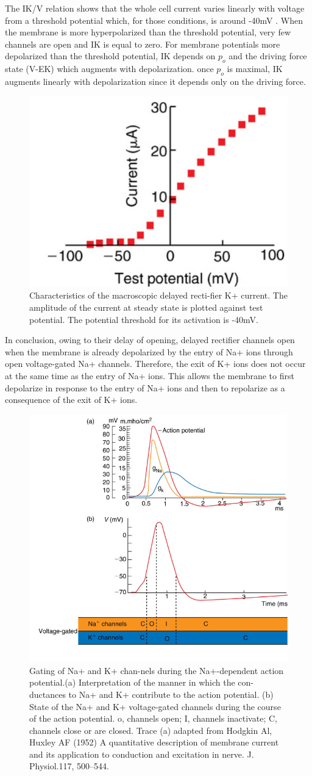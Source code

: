 \documentclass[../../Orator]{subfiles}
\begin{document}
The IK/V relation shows that the whole cell current varies linearly with voltage from a threshold potential which, for those conditions, is around -40mV . When the membrane is more hyperpolarized than the threshold potential, very few channels are open and IK is equal to zero. For membrane potentials more depolarized than the threshold potential, IK depends on \(p_o\) and the driving force state (V-EK) which augments with depolarization. once \(p_o\) is maximal, IK augments linearly with depolarization since it depends only on the driving force. 
\begin{figure}[H]
    \centering
    \includegraphics[width=0.5\linewidth]{Pictures//Anakin/IK-V.png}
    \caption{Characteristics of the macroscopic delayed recti-fier K+ current.  The amplitude of the current at steady state is plotted against test potential. The potential threshold for its activation is -40mV.  }
    \label{fig:enter-label}
\end{figure}
In conclusion, owing to their delay of opening, delayed rectifier channels open when the membrane is already depolarized by the entry of Na+ ions through open voltage-gated Na+ channels. Therefore, the exit of K+ ions does not occur at the same time as the entry of Na+ ions. This allows the membrane to first depolarize in response to the entry of Na+ ions and then to repolarize as a consequence of the exit of K+ ions.
 \begin{figure}[H]
     \centering
     \includegraphics[width=0.5\linewidth]{Pictures//Anakin/N.K.png}
     \caption{Gating of Na+ and K+ chan-nels during the Na+-dependent action potential.(a) Interpretation of the manner in which the con-ductances to Na+ and K+ contribute to the action potential. (b) State of the Na+ and K+ voltage-gated channels during the course of the action potential. o, channels open; I, channels inactivate; C, channels close or are closed. Trace (a) adapted from Hodgkin Al, Huxley AF (1952) A quantitative description of membrane current and its application to conduction and excitation in nerve. J. Physiol.117, 500–544.}
     \label{fig:enter-label}
 \end{figure}
 
\end{document}
